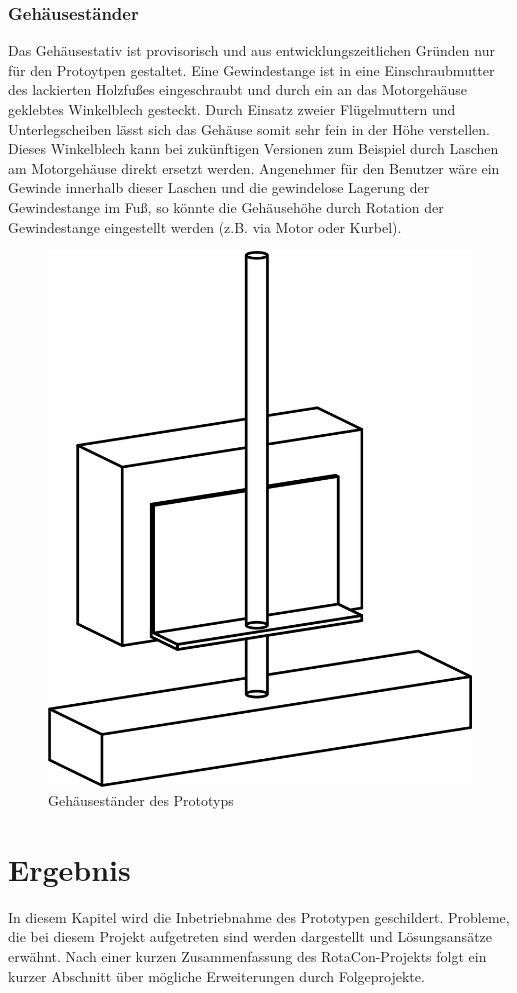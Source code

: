 \documentclass[11pt, titlepage]{report}
\begin{document}
			\subsection{Gehäuseständer}
				Das Gehäusestativ ist provisorisch und aus entwicklungszeitlichen Gründen nur für den Protoytpen gestaltet. Eine Gewindestange ist in eine Einschraubmutter des lackierten Holzfußes eingeschraubt und durch ein an das Motorgehäuse geklebtes Winkelblech gesteckt. Durch Einsatz zweier Flügelmuttern und Unterlegscheiben lässt sich das Gehäuse somit sehr fein in der Höhe verstellen. Dieses Winkelblech kann bei zukünftigen Versionen zum Beispiel durch Laschen am Motorgehäuse direkt ersetzt werden. Angenehmer für den Benutzer wäre ein Gewinde innerhalb dieser Laschen und die gewindelose Lagerung der Gewindestange im Fuß, so könnte die Gehäusehöhe durch Rotation der Gewindestange eingestellt werden (z.B. via Motor oder Kurbel).
				\vspace{3em}
				\begin{figure}[htbp]
					\centering
					\includegraphics[width=0.75\linewidth]{./img/RotaCon.png}
					\caption{Gehäuseständer des Prototyps
					\label{fig:imgRotaCon}}			
				\end{figure}
		\newpage
	\chapter{Ergebnis}
	\label{sec:Epilog}
		In diesem Kapitel wird die Inbetriebnahme des Prototypen geschildert. Probleme, die bei diesem Projekt aufgetreten sind werden dargestellt und Lösungsansätze erwähnt. Nach einer kurzen Zusammenfassung des RotaCon-Projekts folgt ein kurzer Abschnitt über mögliche Erweiterungen durch Folgeprojekte.
\end{document}
